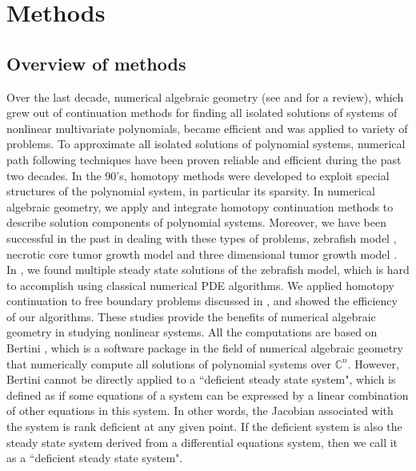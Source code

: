 \def\CTeXPreproc{Created by ctex v0.2.11, don't edit!}\section*{Methods}
\label{sec:method}
\subsection*{Overview of methods}
Over the last decade, numerical algebraic geometry (see \cite{Li}
and \cite{SW} for a review), which grew out of continuation methods
for finding all isolated solutions of systems of nonlinear
multivariate polynomials, became efficient and was applied to
variety of problems. To approximate all isolated solutions of
polynomial systems, numerical path following techniques have been
proven reliable and efficient during the past two decades. In the
90's, homotopy methods were developed to exploit special structures
of the polynomial system, in particular its sparsity. In numerical
algebraic geometry, we apply and integrate homotopy continuation
methods to describe solution components of polynomial systems.
Moreover, we have been successful in the past in dealing with these
types of problems, zebrafish model \cite{HHHLSZ}, necrotic core
tumor growth model \cite{HHHLSZ2} and three dimensional tumor growth
model \cite{HHHS}. In \cite{HHHLSZ2}, we found multiple steady state
solutions of the zebrafish model, which is hard to accomplish using
classical numerical PDE algorithms. We applied homotopy continuation
to free boundary problems discussed in \cite{HHHLSZ2, HHHS},  and
showed the efficiency of our algorithms. These studies provide the
benefits of numerical algebraic geometry in studying nonlinear
systems. All the computations are based on Bertini \cite{Bertini},
which is a software package in the field of numerical algebraic
geometry that numerically compute all solutions of polynomial
systems over $\mathbb{C}^n$. However, Bertini cannot be directly
applied to a ``deficient steady state system", which is defined as
if some equations of a system can be expressed by a linear
combination of other equations in this system. In other words, the
Jacobian associated with the system is rank deficient at any given
point. If the deficient system is also the steady state system
derived from a differential equations system, then we call it as a
``deficient steady state system".

